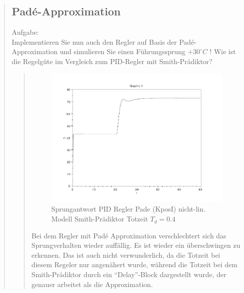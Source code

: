 \begin{quote}
\begin{quote}
    \end{quote}
    
    
    \subsection{Pad\'e-Approximation}
    Aufgabe:\\
    Implementieren Sie nun auch den Regler auf Basis der Pad\'e-Approximation und simulieren Sie einen Führungssprung
    $+30^{\circ} C$ ! Wie ist die Regelgüte im Vergleich zum PID-Regler mit Smith-Prädiktor?\vspace{1em}
    
    
    \begin{quote}
        \begin{figure}[H]
        \centering
            \includegraphics[scale=0.7, trim = 0cm 0cm 0cm 0cm, clip]{./Bilder/4_4_Td_04}
                \caption{Sprungantwort PID Regler Pade (KposI) nicht-lin. Modell Smith-Prädiktor Totzeit $T_d = 0.4$}
        \end{figure}
        
        Bei dem Regler mit Pad\'e Approximation verschlechtert sich das Sprungverhalten wieder auffällig. Es ist wieder
        ein überschwingen zu erkennen. Das ist auch nicht verwunderlich, da die Totzeit bei diesem Regeler nur
        angenähert wurde, während die Totzeit bei dem Smith-Prädiktor durch ein ``Delay''-Block dargestellt wurde, der
        genauer arbeitet als die Approximation.\\
        \vspace{1em}
        

\end{quote}
\end{quote}
